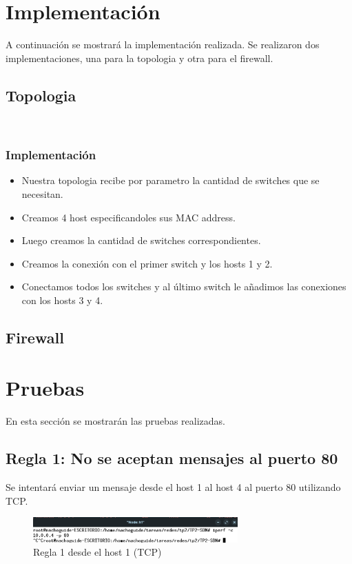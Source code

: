 \documentclass[titlepage,a4paper]{article}
\begin{document}
\section{Implementación}\label{sec:implementacion}
A continuación se mostrará la implementación realizada. Se realizaron dos implementaciones, una para la topologia y otra para el firewall.

\subsection{Topologia}

\\

\subsubsection{Implementación}
\begin{itemize}
    \item Nuestra topologia recibe por parametro la cantidad de switches que se necesitan. \item Creamos 4 host especificandoles sus MAC address.
    \item Luego creamos la cantidad de switches correspondientes.
    \item Creamos la conexión con el primer switch y los hosts 1 y 2.
    \item Conectamos todos los switches y al último switch le añadimos las conexiones con los hosts 3 y 4.
\end{itemize} 

\subsection{Firewall}


\section{Pruebas}\label{sec:pruebas}

En esta sección se mostrarán las pruebas realizadas.

\subsection{Regla 1: No se aceptan mensajes al puerto 80}
Se intentará enviar un mensaje desde el host 1 al host 4 al puerto 80 utilizando TCP.

\begin{figure}[H]
    \centering
    \includegraphics[width=0.7\textwidth]{img/regla1_h1_tcp.png}
    \caption{Regla 1 desde el host 1 (TCP)}
\end{figure}
\end{document}
